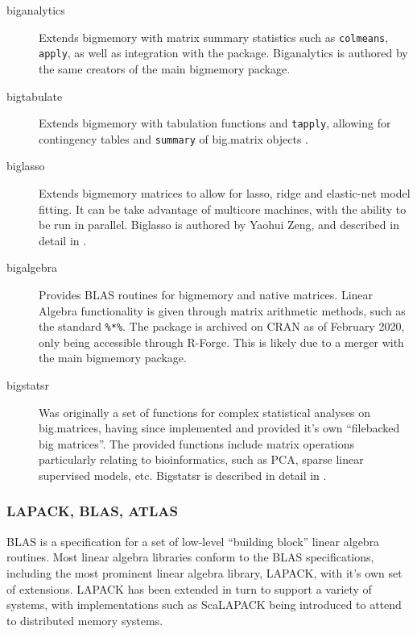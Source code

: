 \begin{description}

    \item[biganalytics]
        Extends bigmemory with matrix summary statistics such as
        \texttt{colmeans}, \texttt{apply}, as well as integration with the 
        package\cite{emerson16}. Biganalytics is authored by the same creators
        of the main bigmemory package.
    \item[bigtabulate]
        Extends bigmemory with tabulation functions and \texttt{tapply},
        allowing for contingency tables and \texttt{summary} of big.matrix
        objects \cite{kane16}.
    \item[biglasso]
        Extends bigmemory matrices to allow for lasso, ridge and elastic-net
        model fitting. It can be take advantage of multicore machines, with the
        ability to be run in parallel. Biglasso is authored by Yaohui Zeng, and
        described in detail in \cite{zeng2017biglasso}.
    \item[bigalgebra]
        Provides BLAS routines for bigmemory and native \R matrices. Linear
        Algebra functionality is given through matrix arithmetic methods, such
        as the standard \texttt{\%*\%}. The package is archived
        on CRAN as of February 2020, only being accessible through R-Forge. This
        is likely due to a merger with the main bigmemory package.
    \item[bigstatsr]
        Was originally a set of functions for complex statistical analyses on
        big.matrices, having since implemented and provided it's own
        ``filebacked big matrices''\cite{prive2018efficient}. The provided
        functions include matrix operations particularly relating to
        bioinformatics, such as PCA, sparse linear supervised models, etc.
        Bigstatsr is described in detail in \cite{prive2018efficient}.
\end{description}

\hypertarget{sec:blas-lapack}{%
    \subsubsection{LAPACK, BLAS, ATLAS}\label{sec:blas-lapack}}

BLAS is a specification for a set of low-level ``building block'' linear
algebra routines\cite{lawson1979basic}. Most linear algebra libraries
conform to the BLAS specifications, including the most prominent linear
algebra library, LAPACK, with it's own set of
extensions\cite{demmel1989lapack}. LAPACK has been extended in turn to
support a variety of systems, with implementations such as ScaLAPACK
being introduced to attend to distributed memory
systems\cite{choi1992scalapack}.

